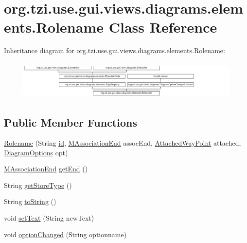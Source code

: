 \hypertarget{classorg_1_1tzi_1_1use_1_1gui_1_1views_1_1diagrams_1_1elements_1_1_rolename}{\section{org.\-tzi.\-use.\-gui.\-views.\-diagrams.\-elements.\-Rolename Class Reference}
\label{classorg_1_1tzi_1_1use_1_1gui_1_1views_1_1diagrams_1_1elements_1_1_rolename}
}
Inheritance diagram for org.\-tzi.\-use.\-gui.\-views.\-diagrams.\-elements.\-Rolename\-:\begin{figure}[H]
\begin{center}
\leavevmode
\includegraphics[height=1.991111cm]{classorg_1_1tzi_1_1use_1_1gui_1_1views_1_1diagrams_1_1elements_1_1_rolename}
\end{center}
\end{figure}
\subsection*{Public Member Functions}
\begin{DoxyCompactItemize}
\item 
\hyperlink{classorg_1_1tzi_1_1use_1_1gui_1_1views_1_1diagrams_1_1elements_1_1_rolename_a37e48887b70ad39b78b0d8ed0068833d}{Rolename} (String \hyperlink{classorg_1_1tzi_1_1use_1_1gui_1_1views_1_1diagrams_1_1elements_1_1_edge_property_a628f8eb4c55c3973fb61f0d76787ac0b}{id}, \hyperlink{classorg_1_1tzi_1_1use_1_1uml_1_1mm_1_1_m_association_end}{M\-Association\-End} assoc\-End, \hyperlink{classorg_1_1tzi_1_1use_1_1gui_1_1views_1_1diagrams_1_1waypoints_1_1_attached_way_point}{Attached\-Way\-Point} attached, \hyperlink{classorg_1_1tzi_1_1use_1_1gui_1_1views_1_1diagrams_1_1_diagram_options}{Diagram\-Options} opt)
\item 
\hyperlink{classorg_1_1tzi_1_1use_1_1uml_1_1mm_1_1_m_association_end}{M\-Association\-End} \hyperlink{classorg_1_1tzi_1_1use_1_1gui_1_1views_1_1diagrams_1_1elements_1_1_rolename_a3692b01b3204f461780a23e4f7e98999}{get\-End} ()
\item 
String \hyperlink{classorg_1_1tzi_1_1use_1_1gui_1_1views_1_1diagrams_1_1elements_1_1_rolename_a800d4c200a4a11f1cf263717aad5b0cb}{get\-Store\-Type} ()
\item 
String \hyperlink{classorg_1_1tzi_1_1use_1_1gui_1_1views_1_1diagrams_1_1elements_1_1_rolename_a79cc05f19a712135e0bc42a50af7c469}{to\-String} ()
\item 
void \hyperlink{classorg_1_1tzi_1_1use_1_1gui_1_1views_1_1diagrams_1_1elements_1_1_rolename_aa5fb7c231ab9bbd248487598aeb07377}{set\-Text} (String new\-Text)
\item 
void \hyperlink{classorg_1_1tzi_1_1use_1_1gui_1_1views_1_1diagrams_1_1elements_1_1_rolename_a9ab9019f62a8fb36d5ad3be923bec7b9}{option\-Changed} (String optionname)
\end{DoxyCompactItemize}
